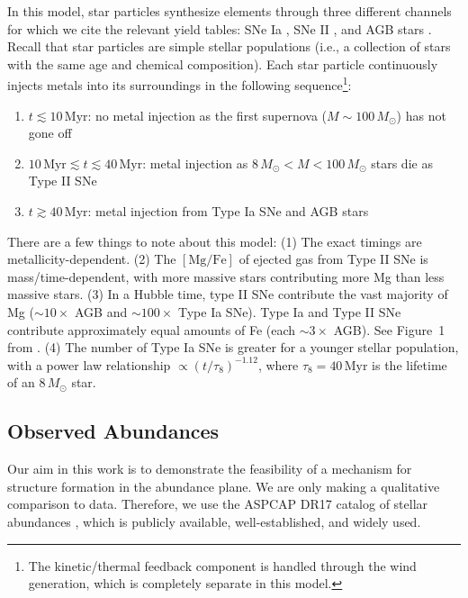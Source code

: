\documentclass[linenumbers, twocolumn]{aastex631}
\newcommand{\Msun}{\ensuremath{M_{\odot}}}
\newcommand{\Myr}{\ensuremath{\textrm{Myr}}}
\newcommand{\MgFe}{\ensuremath{[\textrm{Mg}/\textrm{Fe}]}}
\begin{document}
In this model, star particles synthesize elements through three different channels for which we cite the relevant yield tables: SNe Ia \citep{1997NuPhA.621..467N}, SNe II \citep{1998A&A...334..505P,2006ApJ...653.1145K}, and AGB stars \citep{2010MNRAS.403.1413K,2014MNRAS.437..195D,2014ApJ...797...44F}. Recall that star particles are simple stellar populations (i.e., a collection of stars with the same age and chemical composition). Each star particle continuously injects metals into its surroundings in the following sequence\footnote{The kinetic/thermal feedback component is handled through the wind generation, which is completely separate in this model.}:
\begin{enumerate}
    \item $t\lesssim10\,\Myr$: no metal injection as the first supernova ($M\sim100\,\Msun$) has not gone off
    \item $10\,\Myr \lesssim t \lesssim 40\,\Myr$: metal injection as $8\,\Msun<M<100\,\Msun$ stars die as Type II SNe
    \item $t\gtrsim40\,\Myr$: metal injection from Type Ia SNe and AGB stars
\end{enumerate}
There are a few things to note about this model: (1) The exact timings are metallicity-dependent. (2) The \MgFe{} of ejected gas from Type II SNe is mass/time-dependent, with more massive stars contributing more Mg than less massive stars. (3) In a Hubble time, type II SNe contribute the vast majority of Mg ($\sim10\times$ AGB and $\sim100\times$ Type Ia SNe). Type Ia and Type II SNe contribute approximately equal amounts of Fe (each $\sim3\times$ AGB). See Figure~1 from \citet{2018MNRAS.473.4077P}. (4) The number of Type Ia SNe is greater for a younger stellar population, with a power law relationship $\propto \left(t/\tau_8\right)^{-1.12}$, where $\tau_8=40\,\Myr$ is the lifetime of an $8\,\Msun$ star.

\subsection{Observed Abundances}\label{ssec:obs_abund}
Our aim in this work is to demonstrate the feasibility of a mechanism for structure formation in the abundance plane. We are only making a qualitative comparison to data. Therefore, we use the ASPCAP DR17 catalog of stellar abundances \citep[][J.A.~Holtzman et al., in preparation]{2016AJ....151..144G}, which is publicly available, well-established, and widely used.
\end{document}
